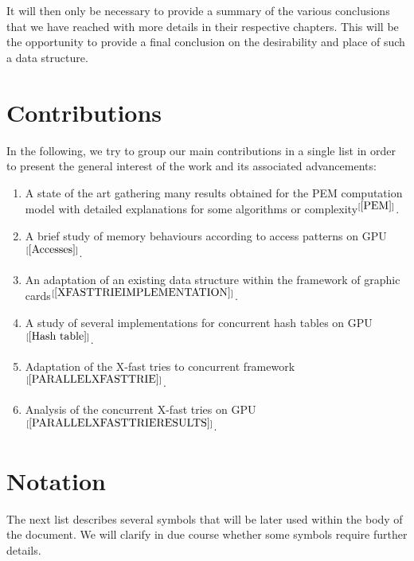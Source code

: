 It will then only be necessary to provide a summary of the various conclusions that we have reached with more details in their respective chapters. This will be the opportunity to provide a final conclusion on the desirability and place of such a data structure.

\section{Contributions}

\noindent
In the following, we try to group our main contributions in a single list in order to present the general interest of the work and its associated advancements:
\vspace{1cm}
\begin{enumerate}
    \item A state of the art gathering many results obtained for the PEM computation model with detailed explanations for some algorithms or complexity$^{[\ref{PEM}]}$.
    \item A brief study of memory behaviours according to access patterns on GPU$^{[\ref{Accesses}]}$.
    \item An adaptation of an existing data structure within the framework of graphic cards$^{[\ref{XFASTTRIEIMPLEMENTATION}]}$.
    \item A study of several implementations for concurrent hash tables on GPU$^{[\ref{Hash table}]}$.
    \item Adaptation of the X-fast tries to concurrent framework$^{[\ref{PARALLELXFASTTRIE}]}$.
    \item Analysis of the concurrent X-fast tries on GPU$^{[\ref{PARALLELXFASTTRIERESULTS}]}$.
\end{enumerate}

\newpage
\section{Notation}

The next list describes several symbols that will be later used within the body of the document. We will clarify in due course whether some symbols require further details.

\vspace{5mm}

